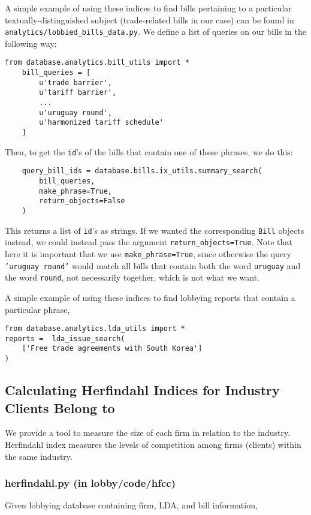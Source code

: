 \documentclass[11pt,letterpaper]{article}
\theoremstyle{plain}
\begin{document}
A simple example of using these indices to find bills pertaining to a
particular textually-distinguished subject (trade-related bills in our
case) can be found in \texttt{analytics/lobbied\_bills\_data.py}.  We
define a list of queries on our bills in the following way:
\begin{verbatim}
from database.analytics.bill_utils import *
    bill_queries = [
        u'trade barrier',
        u'tariff barrier',
        ...
        u'uruguay round',
        u'harmonized tariff schedule'
    ]
\end{verbatim}
Then, to get the \texttt{id}'s of the bills that contain one of these
phrases, we do this:
\begin{verbatim}
    query_bill_ids = database.bills.ix_utils.summary_search(
        bill_queries,
        make_phrase=True,
        return_objects=False
    )
\end{verbatim}
This returns a list of \texttt{id}'s as strings.  If we wanted the
corresponding \texttt{Bill} objects instead, we could instead pass the
argument \texttt{return\_objects=True}.  Note that here it is
important that we use \texttt{make\_phrase=True}, since otherwise the
query \texttt{'uruguay round'} would match all bills that contain both
the word \texttt{uruguay} and the word \texttt{round}, not necessarily
together, which is not what we want.

A simple example of using these indices to find lobbying reports that
contain a particular phrase,
\begin{verbatim}
from database.analytics.lda_utils import *
reports =  lda_issue_search(
    ['Free trade agreements with South Korea']
)
\end{verbatim}

\subsection{Calculating Herfindahl Indices for Industry Clients Belong
to}

We provide a tool to measure the size of each firm in relation to the
industry. Herfindahl index measures the levels of competition among
firms (clients) within the same industry. 

\bigskip
\subsubsection{herfindahl.py (in lobby/code/hfcc)}

Given lobbying database containing firm, LDA, and bill information,
\end{document}
